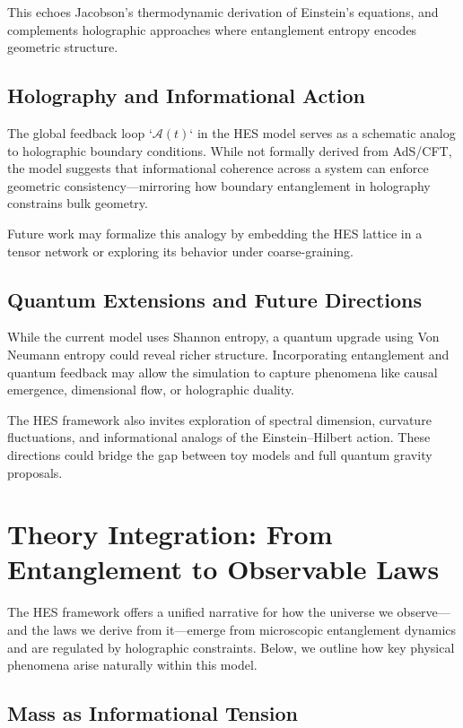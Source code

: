 \documentclass[12pt]{article}
\begin{document}
This echoes Jacobson's thermodynamic derivation of Einstein's equations, and complements holographic approaches where entanglement entropy encodes geometric structure.

\subsection{Holography and Informational Action}

The global feedback loop `\( \mathcal{A}(t) \)` in the HES model serves as a schematic analog to holographic boundary conditions. While not formally derived from AdS/CFT, the model suggests that informational coherence across a system can enforce geometric consistency—mirroring how boundary entanglement in holography constrains bulk geometry.

Future work may formalize this analogy by embedding the HES lattice in a tensor network or exploring its behavior under coarse-graining.

\subsection{Quantum Extensions and Future Directions}

While the current model uses Shannon entropy, a quantum upgrade using Von Neumann entropy could reveal richer structure. Incorporating entanglement and quantum feedback may allow the simulation to capture phenomena like causal emergence, dimensional flow, or holographic duality.

The HES framework also invites exploration of spectral dimension, curvature fluctuations, and informational analogs of the Einstein–Hilbert action. These directions could bridge the gap between toy models and full quantum gravity proposals.

\section{Theory Integration: From Entanglement to Observable Laws}

The HES framework offers a unified narrative for how the universe we observe—and the laws we derive from it—emerge from microscopic entanglement dynamics and are regulated by holographic constraints. Below, we outline how key physical phenomena arise naturally within this model.

\subsection{Mass as Informational Tension}
\end{document}
